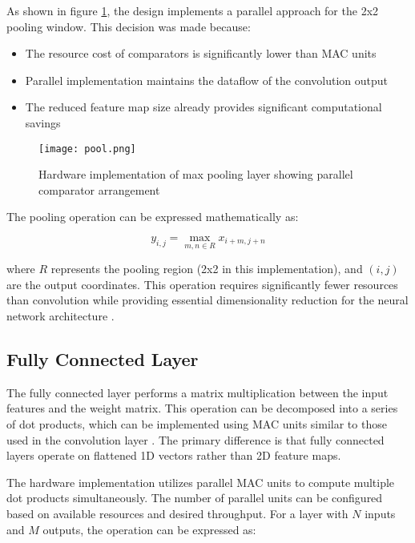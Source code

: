 As shown in figure \ref{fig:pooling_hardware}, the design implements a parallel approach for the 2x2 pooling window. This decision was made because:
\begin{itemize}
    \item The resource cost of comparators is significantly lower than MAC units
    \item Parallel implementation maintains the dataflow of the convolution output
    \item The reduced feature map size already provides significant computational savings
\end{itemize}

\begin{figure}[h]
    \centering
    \texttt{[image: pool.png]}
    \caption{Hardware implementation of max pooling layer showing parallel comparator arrangement}
    \label{fig:pooling_hardware}
\end{figure}

The pooling operation can be expressed mathematically as:

\begin{equation}
    y_{i,j} = \max_{m,n \in R} x_{i+m,j+n}
\end{equation}

where $R$ represents the pooling region (2x2 in this implementation), and $(i,j)$ are the output coordinates. This operation requires significantly fewer resources than convolution while providing essential dimensionality reduction for the neural network architecture \cite{18}.

\subsection{Fully Connected Layer}
\label{sec:fully_connected}

The fully connected layer performs a matrix multiplication between the input features and the weight matrix. This operation can be decomposed into a series of dot products, which can be implemented using MAC units similar to those used in the convolution layer \cite{ResourceEfficient}. The primary difference is that fully connected layers operate on flattened 1D vectors rather than 2D feature maps.

The hardware implementation utilizes parallel MAC units to compute multiple dot products simultaneously. The number of parallel units can be configured based on available resources and desired throughput. For a layer with $N$ inputs and $M$ outputs, the operation can be expressed as:


